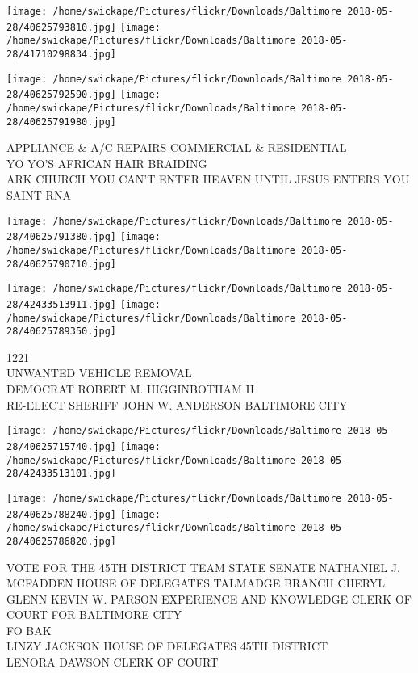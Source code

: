 \documentclass[10pt,letterpaper]{article}
\begin{document}
\texttt{[image: /home/swickape/Pictures/flickr/Downloads/Baltimore 2018-05-28/40625793810.jpg]}
\texttt{[image: /home/swickape/Pictures/flickr/Downloads/Baltimore 2018-05-28/41710298834.jpg]}

\texttt{[image: /home/swickape/Pictures/flickr/Downloads/Baltimore 2018-05-28/40625792590.jpg]}
\texttt{[image: /home/swickape/Pictures/flickr/Downloads/Baltimore 2018-05-28/40625791980.jpg]}

APPLIANCE \& A/C REPAIRS COMMERCIAL \& RESIDENTIAL\\
YO YO'S AFRICAN HAIR BRAIDING\\
ARK CHURCH YOU CAN'T ENTER HEAVEN UNTIL JESUS ENTERS YOU\\
SAINT RNA
\pagebreak

\texttt{[image: /home/swickape/Pictures/flickr/Downloads/Baltimore 2018-05-28/40625791380.jpg]}
\texttt{[image: /home/swickape/Pictures/flickr/Downloads/Baltimore 2018-05-28/40625790710.jpg]}

\texttt{[image: /home/swickape/Pictures/flickr/Downloads/Baltimore 2018-05-28/42433513911.jpg]}
\texttt{[image: /home/swickape/Pictures/flickr/Downloads/Baltimore 2018-05-28/40625789350.jpg]}

1221\\
UNWANTED VEHICLE REMOVAL\\
DEMOCRAT ROBERT M. HIGGINBOTHAM II\\
RE{-}ELECT SHERIFF JOHN W. ANDERSON BALTIMORE CITY
\pagebreak

\texttt{[image: /home/swickape/Pictures/flickr/Downloads/Baltimore 2018-05-28/40625715740.jpg]}
\texttt{[image: /home/swickape/Pictures/flickr/Downloads/Baltimore 2018-05-28/42433513101.jpg]}

\texttt{[image: /home/swickape/Pictures/flickr/Downloads/Baltimore 2018-05-28/40625788240.jpg]}
\texttt{[image: /home/swickape/Pictures/flickr/Downloads/Baltimore 2018-05-28/40625786820.jpg]}

VOTE FOR THE 45TH DISTRICT TEAM STATE SENATE NATHANIEL J. MCFADDEN HOUSE OF DELEGATES TALMADGE BRANCH CHERYL GLENN KEVIN W. PARSON EXPERIENCE AND KNOWLEDGE CLERK OF COURT FOR BALTIMORE CITY\\
FO BAK\\
LINZY JACKSON HOUSE OF DELEGATES 45TH DISTRICT\\
LENORA DAWSON CLERK OF COURT
\pagebreak
\end{document}

